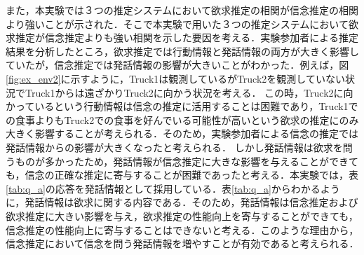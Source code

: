 \par
また，本実験では３つの推定システムにおいて欲求推定の相関が信念推定の相関より強いことが示された．そこで本実験で用いた３つの推定システムにおいて欲求推定が信念推定よりも強い相関を示した要因を考える．実験参加者による推定結果を分析したところ，欲求推定では行動情報と発話情報の両方が大きく影響していたが，信念推定では発話情報の影響が大きいことがわかった．例えば，図\ref{fig:ex_env2}に示すように，Truck1は観測しているがTruck2を観測していない状況でTruck1からは遠ざかりTruck2に向かう状況を考える．
この時，Truck2に向かっているという行動情報は信念の推定に活用することは困難であり，Truck1での食事よりもTruck2での食事を好んでいる可能性が高いという欲求の推定にのみ大きく影響することが考えられる．そのため，実験参加者による信念の推定では発話情報からの影響が大きくなったと考えられる．
しかし発話情報は欲求を問うものが多かったため，発話情報が信念推定に大きな影響を与えることができても，信念の正確な推定に寄与することが困難であったと考える．本実験では，表\ref{tab:q_a}の応答を発話情報として採用している．表\ref{tab:q_a}からわかるように，発話情報は欲求に関する内容である．そのため，発話情報は信念推定および欲求推定に大きい影響を与え，欲求推定の性能向上を寄与することができても，信念推定の性能向上に寄与することはできないと考える．このような理由から，信念推定において信念を問う発話情報を増やすことが有効であると考えられる．
